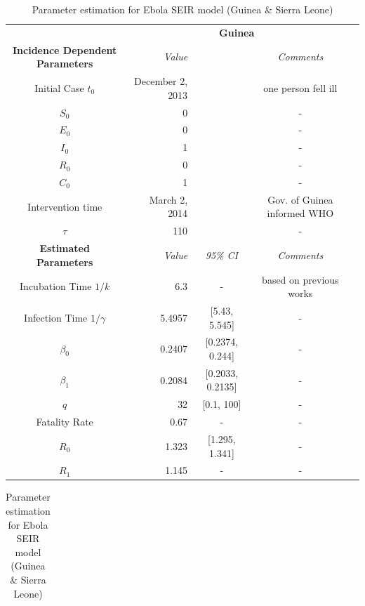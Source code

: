 \documentclass[10pt, journal,onecolumn]{IEEEtran}
\newcommand{\ra}[1]{\renewcommand{\arraystretch}{#1}}
\begin{document}







\begin{appendix}


\begin{table}[h]
\label{Table:parameter}
\caption{Parameter estimation for Ebola SEIR model (Guinea \& Sierra Leone)} 
\centering
\tiny
\parbox{.55\linewidth}{\centering
\ra{1.3}
\begin{tabular}{@{}crccc@{}}%
& \multicolumn{3}{c}{\textbf{Guinea}} &  \\
\cmidrule{2-4}
\textbf{Incidence Dependent Parameters} & \textit{Value} && \textit{Comments} \\
\midrule
Initial Case $t_0$ & December 2, 2013 &  & one person fell ill\\
$S_0$ & 0& & -\\
$E_0$ & 0& & -\\
$I_0$ & 1& & -\\
$R_0$ & 0& & -\\
$C_0$ & 1& &-\\
Intervention time & March 2, 2014 &  & Gov. of Guinea informed WHO\\
$\tau$ &110 & & -\\
\cmidrule{2-4}
\textbf{Estimated Parameters} & \textit{Value} & \textit{95\% CI} & \textit{Comments} \\
\midrule
Incubation Time $1/k$ &6.3 & - & based on previous works \cite{}\\
Infection Time $1/\gamma$ &5.4957 & [5.43, 5.545] & -\\
$\beta_0$ &0.2407 & [0.2374, 0.244] & -\\
$\beta_1$ &0.2084 & [0.2033, 0.2135] & -\\
$q$ &32 & [0.1, 100] & -\\
Fatality Rate &0.67 & - & -\\
$R_0$ &1.323 &[1.295, 1.341] &-\\
$R_1$ &1.145 & - &-\\
\end{tabular}
}
\parbox{.3\linewidth}{
\centering
\ra{1.3}
\begin{tabular}{@{}crccc@{}}%

\end{tabular}}
\end{table}
\end{appendix}
\end{document}
